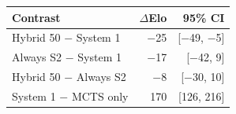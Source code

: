\footnotesize\setlength{\tabcolsep}{4pt}\begin{tabular}{lrr}
\toprule
Contrast & $\Delta$Elo & 95\% CI \\
\midrule
Hybrid 50 $-$ System 1 & \ensuremath{-}25 & [\ensuremath{-}49, \ensuremath{-}5] \\
Always S2 $-$ System 1 & \ensuremath{-}17 & [\ensuremath{-}42, 9] \\
Hybrid 50 $-$ Always S2 & \ensuremath{-}8 & [\ensuremath{-}30, 10] \\
System 1 $-$ MCTS only & 170 & [126, 216] \\
\bottomrule
\end{tabular}
